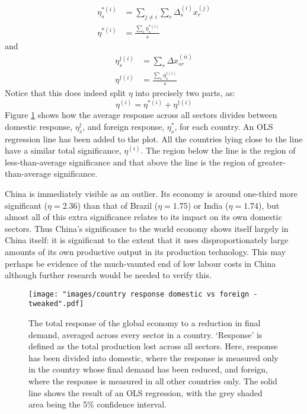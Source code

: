 \documentclass[a4paper]{article}
\begin{document}
\begin{align}
\eta_s^{*(i)} & = 
	\sum_{j \neq i} \sum_r \Delta_{s}^{(i)} x_{r}^{(j)}\nonumber \\
\eta^{*(i)} & = 
	\frac{\sum_s \eta_s^{*(i)}}{s}
\end{align}
and
\begin{align}
\eta_s^{\dagger(i)} & = 
	\sum_r \Delta x_{sr}^{(ii)}\nonumber \\
\eta^{\dagger(i)} & = 
	\frac{\sum_s \eta_s^{\dagger(i)}}{s}
\end{align}
Notice that this does indeed split $\eta$ into precisely two parts, as:
\begin{equation}
\eta^{(i)} = \eta^{*(i)} + \eta^{\dagger(i)}\nonumber
\end{equation}
Figure \ref{fig:countries_domestic_vs_foreign} shows how the average response across all sectors divides between domestic response, $\eta_s^{\dagger}$, and foreign response, $\eta_s^{*}$, for each country. 
An OLS regression line has been added to the plot.
All the countries lying close to the line have a similar total significance, $\eta^{(i)}$.
The region below the line is the region of less-than-average significance and that above the line is the region of greater-than-average significance.

China is immediately visible as an outlier.
Its economy is around one-third more significant ($\eta = 2.36$) than that of Brazil ($\eta = 1.75$) or India ($\eta = 1.74$), but almost all of this extra significance relates to its impact on its own domestic sectors.
Thus China's significance to the world economy shows itself largely in China itself:
it is significant to the extent that it uses disproportionately large amounts of its own productive output in its production technology.
This may perhaps be evidence of the much-vaunted end of low labour costs in China  \parencite{li_end_2012, the_economist_end_2012} although further research would be needed to verify this.

\begin{figure}[tbh]
\centering
\texttt{[image: "images/country response domestic vs foreign - tweaked".pdf]}
\caption{The total response of the global economy to a reduction in final demand, averaged across every sector in a country. 
`Response' is defined as the total production lost across all sectors.
Here, response has been divided into domestic, where the response is measured only in the country whose final demand has been reduced, and foreign, where the response is measured in all other countries only.
The solid line shows the result of an OLS regression, with the grey shaded area being the 5\% confidence interval.}
\label{fig:countries_domestic_vs_foreign}
\end{figure}
\end{document}
